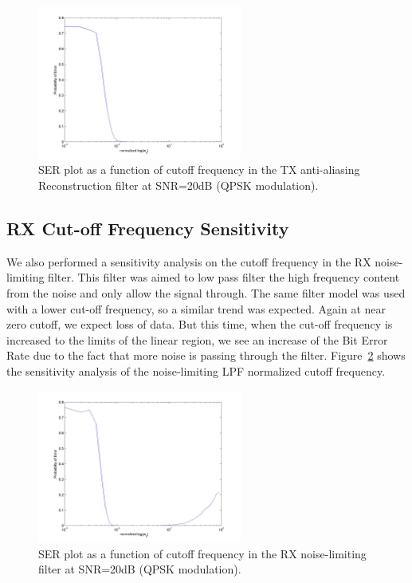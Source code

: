 \documentclass[]{article}
\begin{document}
\begin{figure}[H]
\centering
\includegraphics[width=0.6\textwidth]{freqTX.jpg}
\caption{SER plot as a function of cutoff frequency in the TX anti-aliasing Reconstruction filter at SNR=20dB (QPSK modulation). \label{fig:freqTX}}
\end{figure}

\subsection{RX Cut-off Frequency Sensitivity}
\label{sec:RXcutoff}
We also performed a sensitivity analysis on the cutoff frequency in the RX noise-limiting filter. This filter was aimed to low pass filter the high frequency content from the noise and only allow the signal through. The same filter model was used with a lower cut-off frequency, so a similar trend was expected. Again at near zero cutoff,  we expect loss of data. But this time, when the cut-off frequency is increased to the limits of the linear region, we see an increase of the Bit Error Rate due to the fact that more noise is passing through the filter. Figure~\ref{fig:freqRX} shows the sensitivity analysis of the noise-limiting LPF normalized cutoff frequency. 

\begin{figure}[H]
\centering
\includegraphics[width=0.6\textwidth]{freqRX.jpg}
\caption{SER plot as a function of cutoff frequency in the RX noise-limiting filter at SNR=20dB (QPSK modulation). \label{fig:freqRX}}
\end{figure}
\end{document}
